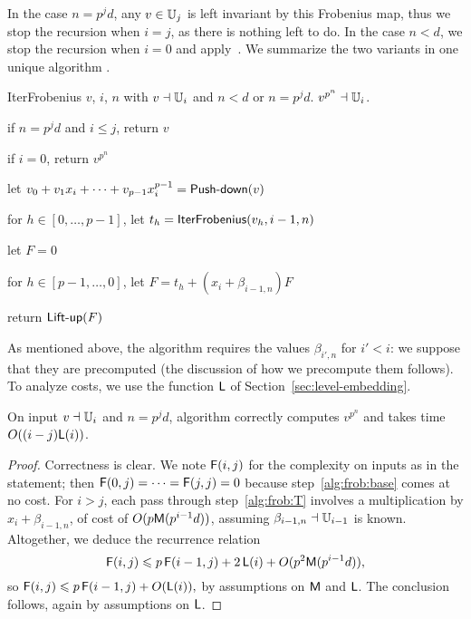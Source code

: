 In the case $n=p^jd$, any $v \in \mathbb{U}_j$ is left invariant by this
Frobenius map, thus we stop the recursion when $i=j$, as there is
nothing left to do. In the case $n<d$, we stop the recursion when
$i=0$ and apply~\cite[Algorithm 5.2]{vzGS92}. We summarize the two
variants in one unique algorithm .
\begin{algorithm}
  {IterFrobenius} 
  {$v$, $i$, $n$ with $v\dashv\mathbb{U}_i$ and $n<d$ or $n=p^jd$.}  
  {$v^{p^n} \dashv \mathbb{U}_i$.}
\item \label{alg:frob:base} if $n=p^jd$ and $i \le j$, return $v$
\item \label{alg:frob:base2} if $i=0$, return $v^{p^n}$
\item \label{alg:frob:push} let $v_0 + v_1 x_i + \dots + v_{p-1} x_i^{p-1}=\text{{\sf Push-down}}(v)$
\item \label{alg:frob:rec} for $h \in [0,\dots,p-1]$, let $t_h = {\sf IterFrobenius}(v_h, i-1, n)$
\item let $F=0$
\item\label{alg:frob:T} for $h \in [p-1,\dots,0]$, let $F = t_h +  (x_i+\beta_{i-1,n})F$
\item \label{alg:frob:lift} return $\text{{\sf Lift-up}}(F)$
\end{algorithm}

As mentioned above, the algorithm requires the values $\beta_{i',n}$
for $i'<i$: we suppose that they are precomputed (the discussion of
how we precompute them follows).  To analyze costs, we use the
function $\mathsf{L}$ of Section~\ref{sec:level-embedding}.
\begin{theorem}
  \label{th:b-ifrob}
  On input $v\dashv\mathbb{U}_i$ and $n=p^jd$, algorithm 
  correctly computes $v^{p^n}$ and takes time $O((i-j)\mathsf{L}(i))$.
\end{theorem}
\begin{proof} Correctness is clear. We note $\mathrm{\sf F}(i,j)$ for the complexity
on inputs as in the statement; then $\mathrm{\sf F}(0,j)=\cdots=\mathrm{\sf F}(j,j)=0$
because step~\ref{alg:frob:base} comes at no cost. For $i>j$, each
pass through step~\ref{alg:frob:T} involves a multiplication by
$x_i+\beta_{i-1,n}$, of cost of $O(p\mathrm{\sf M}(p^{i-1}d))$, assuming
$\beta_{i-1,n}\dashv \mathbb{U}_{i-1}$ is known. Altogether, we deduce the
recurrence relation
$$\mathrm{\sf F}(i,j) \leqslant
p\,\mathrm{\sf F}(i-1,j)+2\,\mathsf{L}(i)+O(p^2\mathrm{\sf M}(p^{i-1}d)),$$ so $\mathrm{\sf F}(i,j) \leqslant
p\,\mathrm{\sf F}(i-1,j)+O(\mathsf{L}(i)),$ by assumptions on $\mathrm{\sf M}$ and $\mathsf{L}$.  The
conclusion follows, again by assumptions on $\mathsf{L}$.\end{proof}

